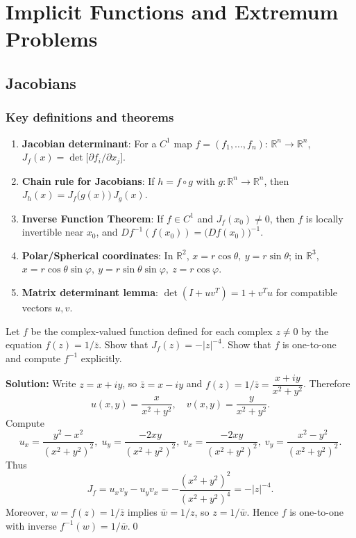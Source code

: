 \chapter{Implicit Functions and Extremum Problems}

\section{Jacobians}
\subsection*{Key definitions and theorems}
\begin{enumerate}[label=(\roman*)]
    \item \textbf{Jacobian determinant}: For a $C^1$ map $f=(f_1,\dots,f_n):\,\mathbb R^n\to\mathbb R^n$, $J_f(x)=\det\big[\partial f_i/\partial x_j\big]$.
    \item \textbf{Chain rule for Jacobians}: If $h=f\circ g$ with $g: \mathbb R^n\to\mathbb R^n$, then $J_h(x)=J_f\big(g(x)\big)\,J_g(x)$.
    \item \textbf{Inverse Function Theorem}: If $f\in C^1$ and $J_f(x_0)\neq 0$, then $f$ is locally invertible near $x_0$, and $D f^{-1}(f(x_0))=\big(D f(x_0)\big)^{-1}$.
    \item \textbf{Polar/Spherical coordinates}: In $\mathbb R^2$, $x=r\cos\theta,\ y=r\sin\theta$; in $\mathbb R^3$, $x=r\cos\theta\sin\varphi,\ y=r\sin\theta\sin\varphi,\ z=r\cos\varphi$.
    \item \textbf{Matrix determinant lemma}: $\det(I+uv^{\!T})=1+v^{\!T}u$ for compatible vectors $u,v$.
\end{enumerate}


\begin{problembox}
Let \( f \) be the complex-valued function defined for each complex \( z \neq 0 \) by the equation \( f(z) = 1/\bar{z} \). Show that \( J_f(z) = -|z|^{-4} \). Show that \( f \) is one-to-one and compute \( f^{-1} \) explicitly.
\end{problembox}

\noindent\textbf{Solution:}
Write $z=x+iy$, so $\bar z=x-iy$ and $f(z)=1/\bar z=\dfrac{x+iy}{x^2+y^2}$. Therefore
\[u(x,y)=\frac{x}{x^2+y^2},\quad v(x,y)=\frac{y}{x^2+y^2}.
\]
Compute
\[u_x=\frac{y^2-x^2}{(x^2+y^2)^2},\; u_y=\frac{-2xy}{(x^2+y^2)^2},\; v_x=\frac{-2xy}{(x^2+y^2)^2},\; v_y=\frac{x^2-y^2}{(x^2+y^2)^2}.
\]
Thus
\[J_f=u_xv_y-u_yv_x=-\frac{(x^2+y^2)^2}{(x^2+y^2)^4}=-|z|^{-4}.
\]
Moreover, $w=f(z)=1/\bar z$ implies $\bar w=1/z$, so $z=1/\bar w$. Hence $f$ is one-to-one with inverse $f^{-1}(w)=1/\bar w$.\qed


